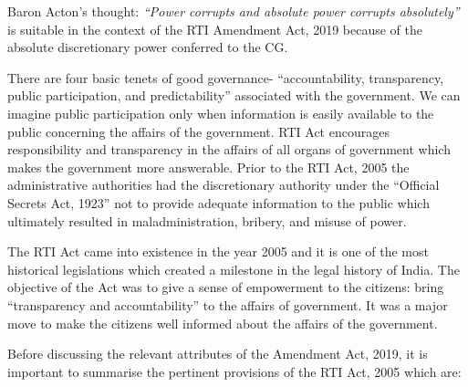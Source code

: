 \setcounter{figure}{0}
\setcounter{table}{0}
\setcounter{footnote}{0}

\label{2020-art2}

\begin{multicols}{2}


\vspace{-.15cm}

\noi
Baron Acton’s thought: \textit{“Power corrupts and absolute power corrupts absolutely”} is suitable
in the context of the RTI Amendment Act, 2019 because of the absolute discretionary power
conferred to the CG.

\vspace{-.15cm}

\noi
There are four basic tenets of good governance- “accountability, transparency, public
participation, and predictability” associated with the government. We can imagine public
participation only when information is easily available to the public concerning the affairs of
the government. RTI Act encourages responsibility and transparency in the affairs of all
organs of government which makes the government more answerable. Prior to the RTI Act,
2005 the administrative authorities had the discretionary authority under the “Official Secrets
Act, 1923” not to provide adequate information to the public which ultimately resulted in
maladministration, bribery, and misuse of power.

\noi
The RTI Act came into existence in the year 2005 and it is one of the most historical
legislations which created a milestone in the legal history of India. The objective of the Act
was to give a sense of empowerment to the citizens: bring “transparency and accountability”
to the affairs of government. It was a major move to make the citizens well informed about
the affairs of the government.

\vspace{-.15cm}


\vspace{-.15cm}

\noi
Before discussing the relevant attributes of the Amendment Act, 2019, it is important to
summarise the pertinent provisions of the RTI Act, 2005 which are:


\end{multicols}
